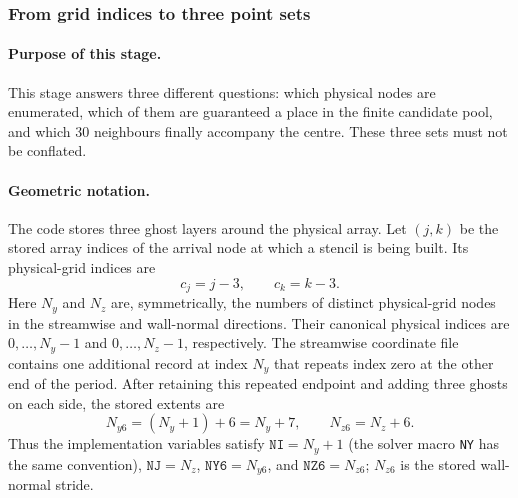 \documentclass[11pt,a4paper]{article}
\begin{document}
\subsubsection{From grid indices to three point sets}
\label{sec:project-point-sets}

\paragraph{Purpose of this stage.}
This stage answers three different questions: which physical nodes are enumerated,
which of them are guaranteed a place in the finite candidate pool, and which 30
neighbours finally accompany the centre. These three sets must not be conflated.

\paragraph{Geometric notation.}
The code stores three ghost layers around the physical array. Let $(j,k)$ be the stored
array indices of the arrival node at which a stencil is being built. Its physical-grid
indices are
\begin{equation}
 c_j=j-3,\qquad c_k=k-3.
\label{eq:project-centre-index}
\end{equation}
Here $N_y$ and $N_z$ are, symmetrically, the numbers of distinct physical-grid nodes in
the streamwise and wall-normal directions. Their canonical physical indices are
$0,\ldots,N_y-1$ and $0,\ldots,N_z-1$, respectively. The streamwise coordinate file
contains one additional record at index $N_y$ that repeats index zero at the other end
of the period. After retaining this repeated endpoint and adding three ghosts on each
side, the stored extents are
\begin{equation}
 N_{y6}=(N_y+1)+6=N_y+7,\qquad N_{z6}=N_z+6.
\label{eq:project-stored-extents}
\end{equation}
Thus the implementation variables satisfy
$\texttt{NI}=N_y+1$ (the solver macro \texttt{NY} has the same convention),
$\texttt{NJ}=N_z$,
$\texttt{NY6}=N_{y6}$, and $\texttt{NZ6}=N_{z6}$; $N_{z6}$ is the stored
wall-normal stride.
\end{document}
